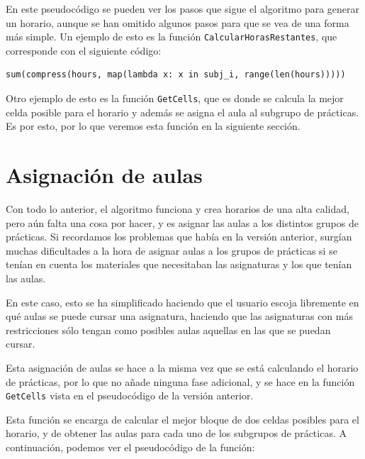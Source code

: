 En este pseudocódigo se pueden ver los pasos que sigue el algoritmo para generar un horario, aunque se han omitido algunos pasos para que se vea de una forma más simple. Un ejemplo de esto es la función \texttt{CalcularHorasRestantes}, que corresponde con el siguiente código:

\begin{verbatim}
sum(compress(hours, map(lambda x: x in subj_i, range(len(hours)))))  
\end{verbatim}

Otro ejemplo de esto es la función \texttt{GetCells}, que es donde se calcula la mejor celda posible para el horario y además se asigna el aula al subgrupo de prácticas. Es por esto,  por lo que veremos esta función en la siguiente sección.

\section{Asignación de aulas}

Con todo lo anterior, el algoritmo funciona y crea horarios de una alta calidad, pero aún falta una cosa por hacer, y es asignar las aulas a los distintos grupos de prácticas. Si recordamos los problemas que había en la versión anterior, surgían muchas dificultades a la hora de asignar aulas a los grupos de prácticas si se tenían en cuenta los materiales que necesitaban las asignaturas y los que tenían las aulas.

En este caso, esto se ha simplificado haciendo que el usuario escoja libremente en qué aulas se puede cursar una asignatura, haciendo que las asignaturas con más restricciones sólo tengan como posibles aulas aquellas en las que se puedan cursar.

Esta asignación de aulas se hace a la misma vez que se está calculando el horario de prácticas, por lo que no añade ninguna fase adicional, y se hace en la función \texttt{GetCells} vista en el pseudocódigo de la versión anterior.

Esta función se encarga de calcular el mejor bloque de dos celdas posibles para el horario, y de obtener las aulas para cada uno de los subgrupos de prácticas. A continuación, podemos ver el pseudocódigo de la función:

